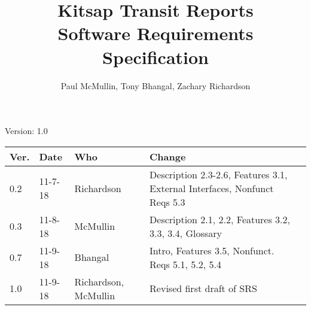 \documentclass[letterpaper,12pt]{article}
\title{Kitsap Transit Reports\\Software Requirements Specification}
\author{Paul McMullin, Tony Bhangal, Zachary Richardson}
\begin{document}
\maketitle

\begin{center}
  Version: 1.0
\end{center}

\vfill
\begin{tabularx}{\linewidth}{|l|l|l|X|l|}\hline
Ver. & Date & Who & Change \\\hline
0.2     &  11-7-18    &  Richardson   &   Description 2.3-2.6, Features 3.1, External Interfaces, Nonfunct Reqs 5.3  \\\hline
0.3     &  11-8-18    &  McMullin   &  Description 2.1, 2.2, Features 3.2, 3.3, 3.4, Glossary \\\hline
0.7  &   11-9-18   &  Bhangal  & Intro, Features 3.5, Nonfunct. Reqs 5.1, 5.2, 5.4     \\\hline
1.0  &   11-9-18   &  Richardson, McMullin   & Revised first draft of SRS    \\\hline

\end{tabularx}

\newpage







\appendix 

%
%
\end{document}
